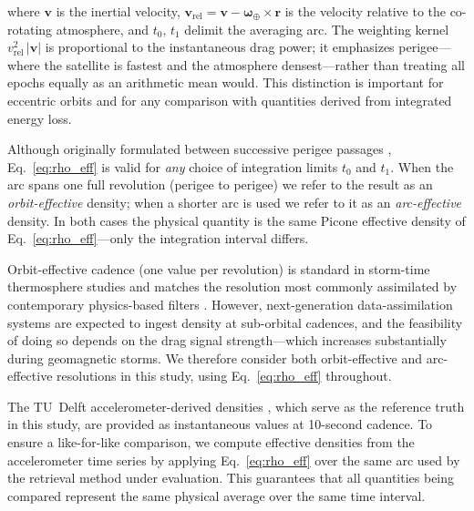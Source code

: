 \documentclass{agujournal2019}
\begin{document}
\noindent where $\mathbf{v}$ is the inertial velocity,
$\mathbf{v}_{\mathrm{rel}} = \mathbf{v} - \boldsymbol{\omega}_{\oplus}
\times\mathbf{r}$ is the velocity relative to the co-rotating atmosphere,
and $t_{0},\,t_{1}$ delimit the averaging arc. The weighting kernel
$v_{\mathrm{rel}}^{2}\,|\mathbf{v}|$ is proportional to the instantaneous
drag power; it emphasizes perigee—where the satellite is fastest and the
atmosphere densest—rather than treating all epochs equally as an arithmetic
mean would. This distinction is important for eccentric orbits and for any
comparison with quantities derived from integrated energy loss.

Although originally formulated between successive perigee passages
\cite{Picone2005ThermosphericSets}, Eq.~\eqref{eq:rho_eff} is valid for
\emph{any} choice of integration limits $t_{0}$ and $t_{1}$. When the arc
spans one full revolution (perigee to perigee) we refer to the result as
an \emph{orbit-effective} density; when a shorter arc is used we refer to it
as an \emph{arc-effective} density. In both cases the physical quantity is the
same Picone effective density of Eq.~\eqref{eq:rho_eff}—only the integration
interval differs.

Orbit-effective cadence (one value per revolution) is standard in storm-time
thermosphere studies \cite{Fitzpatrick2024ApplyingSatellite,
Chen2014Storm-timePropagation, Bruinsma2018SpaceOrbit,
Li2017ThermosphericMethod} and matches the resolution most commonly
assimilated by contemporary physics-based filters \cite{Matsuo2012DataDensity,
Sutton2018AThermosphere, Sutton2021TowardSatellites}. However, next-generation
data-assimilation systems are expected to ingest density at sub-orbital
cadences, and the feasibility of doing so depends on the drag signal
strength—which increases substantially during geomagnetic storms. We therefore
consider both orbit-effective and arc-effective resolutions in this study,
using Eq.~\eqref{eq:rho_eff} throughout.

The TU~Delft accelerometer-derived densities
\cite{Siemes2023NewGRACE-FO}, which serve as the reference truth in this
study, are provided as instantaneous values at 10-second cadence. To ensure
a like-for-like comparison, we compute effective densities from the
accelerometer time series by applying Eq.~\eqref{eq:rho_eff} over the same
arc used by the retrieval method under evaluation. This guarantees that all
quantities being compared represent the same physical average over the same
time interval.
\end{document}
